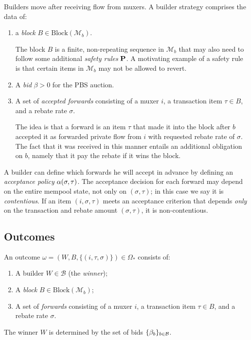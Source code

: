 Builders move after receiving flow from muxers.
%
A builder strategy comprises the data of:
%
\begin{enumerate}
  \item a \emph{block} $B\in \mathrm{Block}(\mathcal{M}_b)$.

  The block $B$ is a finite, non-repeating sequence in $\mathcal{M}_b$ that may also need to follow some additional \emph{safety rules} $\mathbf{P}$.
  A motivating example of a safety rule is that certain items in $\mathcal{M}_b$ may not be allowed to revert.

  \item A \emph{bid} $\beta>0$ for the PBS auction.
  \item 
    A set of \emph{accepted forwards} consisting of a muxer $i$, a transaction item $\tau\in B$, and a rebate rate $\sigma$.

    The idea is that a forward is an item $\tau$ that made it into the block after $b$ accepted it as forwarded private flow from $i$ with requested rebate rate of $\sigma$.
    The fact that it was received in this manner entails an additional obligation on $b$, namely that it pay the rebate if it wins the block.

\end{enumerate}
%
A builder can define which forwards he will accept in advance by defining an \emph{acceptance policy} $\alpha(\sigma,\tau)$.
%
The acceptance decision for each forward may depend on the entire mempool state, not only on $(\sigma,\tau)$; in this case we say it is \emph{contentious}.
%
If an item $(i,\sigma,\tau)$ meets an acceptance criterion that depends \emph{only} on the transaction and rebate amount $(\sigma,\tau)$, it is non-contentious.



\subsection*{Outcomes}

An outcome $\omega = (W,B,\{(i,\tau,\sigma)\})\in \Omega_*$ consists of:
%
\begin{enumerate}
  \item 
    A builder $W\in\mathcal{B}$ (the \emph{winner});
  \item
    A \emph{block} $B\in \mathrm{Block}(\mathcal{M}_b)$;
  \item
    A set of \emph{forwards} consisting of a muxer $i$, a transaction item $\tau\in B$, and a rebate rate $\sigma$.
\end{enumerate}
%
The winner $W$ is determined by the set of bids $\{\beta_b\}_{b\in\mathcal{B}}$.

